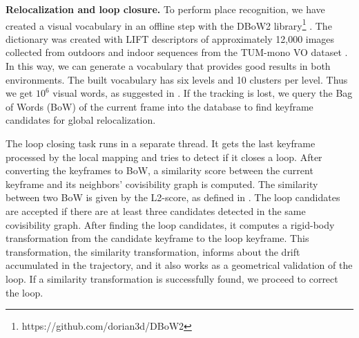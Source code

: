 \textbf{Relocalization and loop closure.} To perform place recognition, we have created a visual vocabulary in an offline step with the DBoW2 library\footnote{https://github.com/dorian3d/DBoW2} \cite{dbow2}. The dictionary was created with LIFT descriptors of approximately 12,000 images collected from outdoors and indoor sequences from the TUM-mono VO dataset \cite{tum-mono-vo}. In this way, we can generate a vocabulary that provides good results in both environments. The built vocabulary has six levels and 10 clusters per level. Thus we get $10^6$ visual words, as suggested in \cite{vocabulary-based-slam}. If the tracking is lost, we query the Bag of Words (BoW) of the current frame into the database to find keyframe candidates for global relocalization.


The loop closing task runs in a separate thread. It gets the last keyframe processed by the local mapping and tries to detect if it closes a loop. After converting the keyframes to BoW, a similarity score between the current keyframe and its neighbors' covisibility graph is computed. The similarity between two BoW is given by the L2-score, as defined in \cite{vocabulary-tree}. The loop candidates are accepted if there are at least three candidates detected in the same covisibility graph. After finding the loop candidates, it computes a rigid-body transformation from the candidate keyframe to the loop keyframe. This transformation, the similarity transformation, informs about the drift accumulated in the trajectory, and it also works as a geometrical validation of the loop. If a similarity transformation is successfully found, we proceed to correct the loop. 



